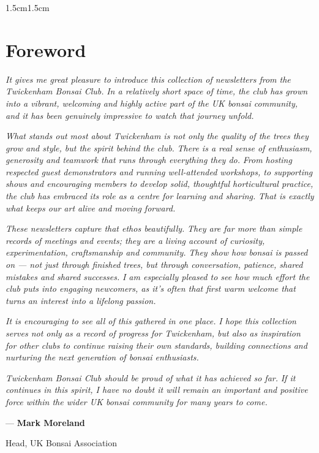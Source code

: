 \begin{adjustwidth}{1.5cm}{1.5cm}
    \chapter*{Foreword}
    \textit{It gives me great pleasure to introduce this collection of newsletters from the Twickenham Bonsai Club.}
    \textit{In a relatively short space of time, the club has grown into a vibrant, welcoming and highly active part of the UK bonsai community, and it has been genuinely impressive to watch that journey unfold.}

    \null
    \textit{What stands out most about Twickenham is not only the quality of the trees they grow and style, but the spirit behind the club.}
    \textit{There is a real sense of enthusiasm, generosity and teamwork that runs through everything they do.}
    \textit{From hosting respected guest demonstrators and running well\--attended workshops, to supporting shows and encouraging members to develop solid, thoughtful horticultural practice, the club has embraced its role as a centre for learning and sharing.}
    \textit{That is exactly what keeps our art alive and moving forward.}

    \null
    \textit{These newsletters capture that ethos beautifully.}
    \textit{They are far more than simple records of meetings and events; they are a living account of curiosity, experimentation, craftsmanship and community.}
    \textit{They show how bonsai is passed on --- not just through finished trees, but through conversation, patience, shared mistakes and shared successes.}
    \textit{I am especially pleased to see how much effort the club puts into engaging newcomers, as it's often that first warm welcome that turns an interest into a lifelong passion.}

    \null
    \textit{It is encouraging to see all of this gathered in one place.}
    \textit{I hope this collection serves not only as a record of progress for Twickenham, but also as inspiration for other clubs to continue raising their own standards, building connections and nurturing the next generation of bonsai enthusiasts.}

    \null
    \textit{Twickenham Bonsai Club should be proud of what it has achieved so far.}
    \textit{If it continues in this spirit, I have no doubt it will remain an important and positive force within the wider UK bonsai community for many years to come.}

    \null
    \hfill --- \textbf{Mark Moreland}

    \hfill Head, UK Bonsai Association
\end{adjustwidth}
